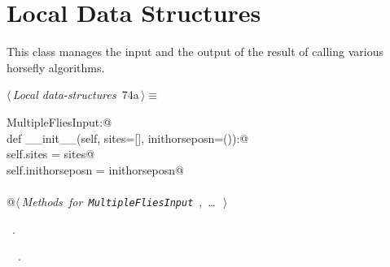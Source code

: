 \documentclass[11.5pt]{report}
\begin{document}
\needspace{7cm}
\section{Local Data Structures}


\newchunk This class manages the input and the output of the result of 
calling various horsefly algorithms. 

\begin{flushleft} \small
\begin{minipage}{\linewidth}\label{scrap110}\raggedright\small
{} $\langle\,${\itshape Local data-structures}\nobreak\ {\footnotesize {74a}}$\,\rangle\equiv$
\vspace{-1ex}
\begin{list}{}{} \item
\mbox{}\verb@class MultipleFliesInput:@\\
\mbox{}\verb@      def __init__(self, sites=[], inithorseposn=()):@\\
\mbox{}\verb@           self.sites           = sites@\\
\mbox{}\verb@           self.inithorseposn   = inithorseposn@\\
\mbox{}\verb@@\\
\mbox{}\verb@      @\hbox{$\langle\,${\itshape Methods for \verb|MultipleFliesInput|}\nobreak\ {\footnotesize {}, \ldots\ }$\,\rangle$}\verb@@\\
\mbox{}\verb@@{\NWsep}
\end{list}
\vspace{-1.5ex}
\footnotesize
\begin{list}{}{\setlength{\itemsep}{-\parsep}\setlength{\itemindent}{-\leftmargin}}
\item \NWtxtMacroRefIn\ .
\item \NWtxtIdentsDefed\nobreak\  \verb@HorseFlyInput@\nobreak\ \NWtxtIdentsNotUsed.
\item{}
\end{list}
\end{minipage}\vspace{4ex}
\end{flushleft}
\end{document}
